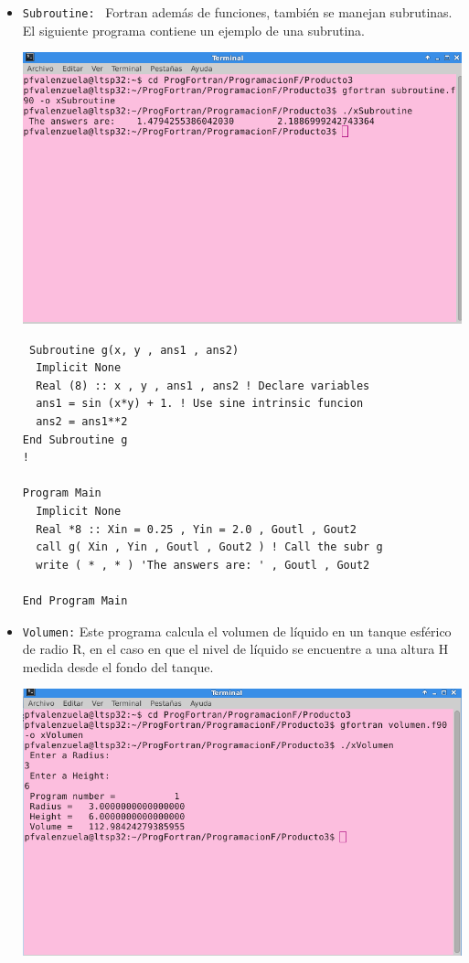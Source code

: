 \documentclass[12pt]{article}
\begin{document}
\begin{itemize}
 \item {\tt Subroutine: }
 Fortran además de funciones, también se manejan subrutinas. El siguiente programa contiene un ejemplo de una subrutina.
\begin{center}
 \includegraphics[scale=0.5]{Subroutine.png}
\end{center}
\begin{verbatim}
 Subroutine g(x, y , ans1 , ans2)
  Implicit None
  Real (8) :: x , y , ans1 , ans2 ! Declare variables
  ans1 = sin (x*y) + 1. ! Use sine intrinsic funcion
  ans2 = ans1**2
End Subroutine g
!

Program Main 
  Implicit None
  Real *8 :: Xin = 0.25 , Yin = 2.0 , Goutl , Gout2
  call g( Xin , Yin , Goutl , Gout2 ) ! Call the subr g
  write ( * , * ) 'The answers are: ' , Goutl , Gout2

End Program Main 
 \end{verbatim}
 
  \item {\tt Volumen:}
  Este programa calcula el volumen de líquido en un tanque esférico de radio R, en el caso en que el nivel de líquido se encuentre a una altura H medida desde el fondo del tanque.
  
\begin{center}
\includegraphics[scale=0.5]{Volumen.png}


\end{center}
\end{itemize}
\end{document}
